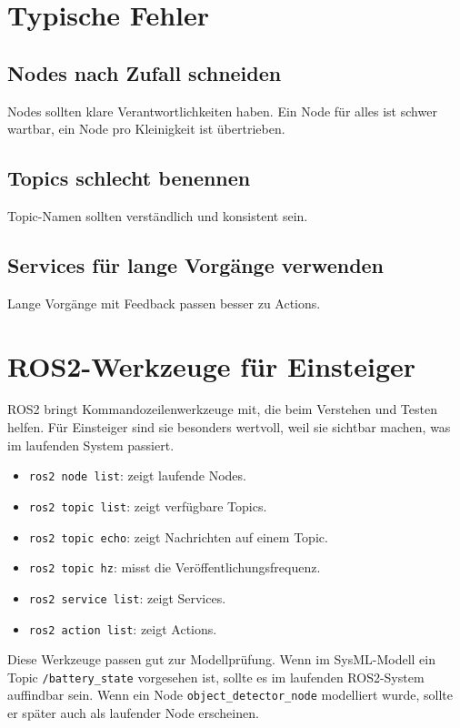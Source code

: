 \section{Typische Fehler}
\subsection{Nodes nach Zufall schneiden}
Nodes sollten klare Verantwortlichkeiten haben. Ein Node für alles ist schwer wartbar, ein Node pro Kleinigkeit ist übertrieben.

\subsection{Topics schlecht benennen}
Topic-Namen sollten verständlich und konsistent sein.

\subsection{Services für lange Vorgänge verwenden}
Lange Vorgänge mit Feedback passen besser zu Actions.

\section{ROS2-Werkzeuge für Einsteiger}
ROS2 bringt Kommandozeilenwerkzeuge mit, die beim Verstehen und Testen helfen. Für Einsteiger sind sie besonders wertvoll, weil sie sichtbar machen, was im laufenden System passiert.

\begin{itemize}
    \item \texttt{ros2 node list}: zeigt laufende Nodes.
    \item \texttt{ros2 topic list}: zeigt verfügbare Topics.
    \item \texttt{ros2 topic echo}: zeigt Nachrichten auf einem Topic.
    \item \texttt{ros2 topic hz}: misst die Veröffentlichungsfrequenz.
    \item \texttt{ros2 service list}: zeigt Services.
    \item \texttt{ros2 action list}: zeigt Actions.
\end{itemize}

Diese Werkzeuge passen gut zur Modellprüfung. Wenn im SysML-Modell ein Topic \texttt{/battery\_state} vorgesehen ist, sollte es im laufenden ROS2-System auffindbar sein. Wenn ein Node \texttt{object\_detector\_node} modelliert wurde, sollte er später auch als laufender Node erscheinen.

